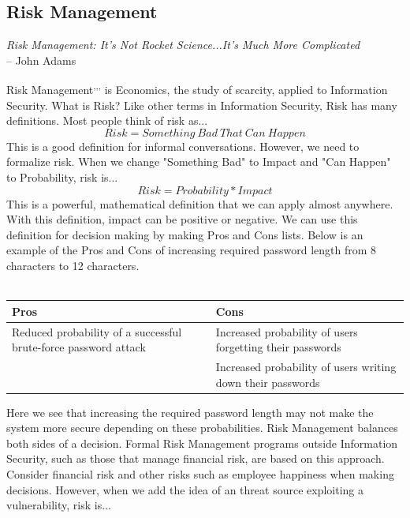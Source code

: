 \subsection{Risk Management}
\begin{mdframed}
\emph{Risk Management: It's Not Rocket Science...It's Much More Complicated}\\ -- John Adams
\end{mdframed}
Risk Management\textsuperscript{,}\textsuperscript{,}\textsuperscript{,} is Economics, the study of scarcity, applied to Information Security. What is Risk? Like other terms in Information Security, Risk has many definitions. Most people think of risk as...
\begin{equation}
Risk = Something\ Bad\ That\ Can\ Happen
\end{equation}
This is a good definition for informal conversations. However, we need to formalize risk. When we change "Something Bad" to Impact and "Can Happen" to Probability, risk is...
\begin{equation}
Risk = Probability * Impact
\end{equation}
This is a powerful, mathematical definition that we can apply almost anywhere. With this definition, impact can be positive or negative. We can use this definition for decision making by making Pros and Cons lists. Below is an example of the Pros and Cons of increasing required password length from 8 characters to 12 characters.\\\\
\begin{tabularx}{\textwidth}{ X | X }
Pros & Cons\\\hline
Reduced probability of a successful brute-force password attack & Increased probability of users forgetting their passwords\\
 & Increased probability of users writing down their passwords
\end{tabularx}\vspace{5mm}
Here we see that increasing the required password length may not make the system more secure depending on these probabilities. Risk Management balances both sides of a decision. Formal Risk Management programs outside Information Security, such as those that manage financial risk, are based on this approach. Consider financial risk and other risks such as employee happiness when making decisions. However, when we add the idea of an threat source exploiting a vulnerability, risk is...
